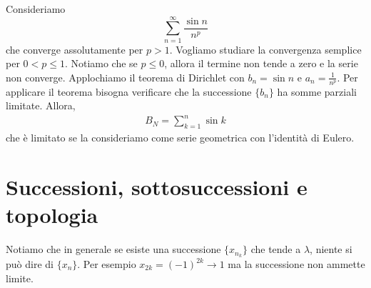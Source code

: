 \documentclass[a4paper]{article}
\begin{document}
Consideriamo
\[
    \sum_{n=1}^\infty \frac{\sin n}{n^p}
\]
che converge assolutamente per \(p>1\).
Vogliamo studiare la convergenza semplice per \(0 < p \leq 1\).
Notiamo che se \(p \leq 0\), allora il termine non tende a zero e la serie non converge.
Applochiamo il teorema di Dirichlet con \(b_n = \sin n\) e \(a_n = \frac{1}{n^p}\).
Per applicare il teorema bisogna verificare che la successione \(\{b_n\}\) ha somme parziali limitate.
Allora,
\begin{align*}
    B_N = \sum_{k=1}^n \sin k
\end{align*}
che è limitato se la consideriamo come serie geometrica con l'identità di Eulero.

\pagebreak

\section{Successioni, sottosuccessioni e topologia}



Notiamo che in generale se esiste una successione \(\{x_{n_k}\}\) che tende a \(\lambda\),
niente si può dire di \(\{x_n\}\). Per esempio \(x_{2k} = {(-1)}^{2k} \to 1\) ma la successione
non ammette limite.
\end{document}
